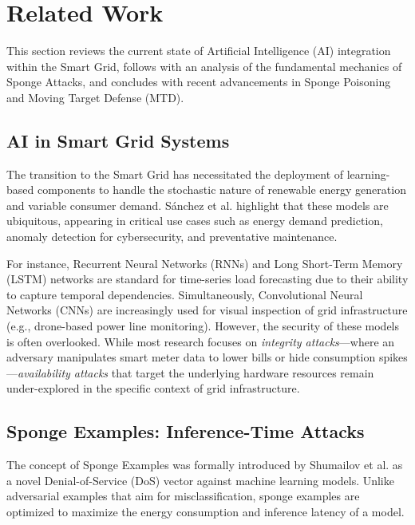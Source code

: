\section{Related Work}
\label{sec:related}

This section reviews the current state of Artificial Intelligence (AI) integration within the Smart Grid, follows with an analysis of the fundamental mechanics of Sponge Attacks, and concludes with recent advancements in Sponge Poisoning and Moving Target Defense (MTD).

\subsection{AI in Smart Grid Systems}
The transition to the Smart Grid has necessitated the deployment of learning-based components to handle the stochastic nature of renewable energy generation and variable consumer demand. S{\'a}nchez et al. \cite{sanchez2024attacking} highlight that these models are ubiquitous, appearing in critical use cases such as energy demand prediction, anomaly detection for cybersecurity, and preventative maintenance.

For instance, Recurrent Neural Networks (RNNs) and Long Short-Term Memory (LSTM) networks are standard for time-series load forecasting due to their ability to capture temporal dependencies. Simultaneously, Convolutional Neural Networks (CNNs) \cite{sanchez2024attacking, shapira2023phantom} are increasingly used for visual inspection of grid infrastructure (e.g., drone-based power line monitoring). However, the security of these models is often overlooked. While most research focuses on \textit{integrity attacks}—where an adversary manipulates smart meter data to lower bills or hide consumption spikes—\textit{availability attacks} that target the underlying hardware resources remain under-explored in the specific context of grid infrastructure.

\subsection{Sponge Examples: Inference-Time Attacks}
The concept of Sponge Examples was formally introduced by Shumailov et al. \cite{shumailov2021sponge} as a novel Denial-of-Service (DoS) vector against machine learning models. Unlike adversarial examples that aim for misclassification, sponge examples are optimized to maximize the energy consumption and inference latency of a model.

